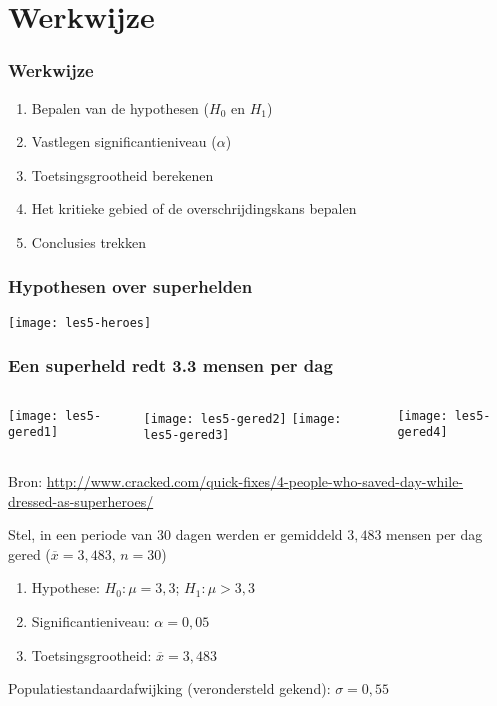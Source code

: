 \documentclass[aspectratio=169]{beamer}
\begin{document}
\section{Werkwijze}

\begin{frame}
  \frametitle{Werkwijze}
  
  \begin{enumerate}
    \item Bepalen van de hypothesen ($H_0$ en $H_1$)
    \item Vastlegen significantieniveau ($\alpha$)
    \item Toetsingsgrootheid berekenen
    \item Het kritieke gebied of de overschrijdingskans bepalen
    \item Conclusies trekken
  \end{enumerate}
\end{frame}

\begin{frame}[plain]
  \frametitle{Hypothesen over superhelden}
  \centering
  \texttt{[image: les5-heroes]}
\end{frame}

\begin{frame}
  \frametitle{Een superheld redt 3.3 mensen per dag}
  
  \begin{columns}
    \centering
    \texttt{[image: les5-gered1]}
    
    \texttt{[image: les5-gered2]}
    \centering
    \texttt{[image: les5-gered3]}
    
    \texttt{[image: les5-gered4]}
  \end{columns}
  
  \vfill
  \centering
  \small{Bron: \url{http://www.cracked.com/quick-fixes/4-people-who-saved-day-while-dressed-as-superheroes/}}
\end{frame}

\begin{frame}
  Stel, in een periode van 30 dagen werden er gemiddeld $3,483$ mensen per dag gered ($\overline{x}=3,483$, $n=30$)
  \vfill
  \begin{enumerate}
    \item Hypothese: $H_0: \mu = 3,3$; $H_1: \mu > 3,3$
    \item Significantieniveau: $\alpha = 0,05$
    \item Toetsingsgrootheid: $\overline{x} = 3,483$
  \end{enumerate}
  \vfill
  Populatiestandaardafwijking (verondersteld gekend): $\sigma = 0,55$
\end{frame}
\end{document}
